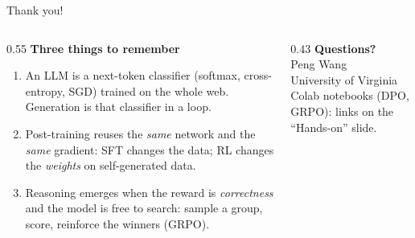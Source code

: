 \begin{frame}{Thank you!}
\begin{columns}[T]
\begin{column}{0.55\textwidth}
\textbf{Three things to remember}
\begin{enumerate}\setlength{\itemsep}{6pt}
  \item An LLM is a next-token classifier (softmax, cross-entropy, SGD) trained on the whole web. Generation is that classifier in a loop.
  \item Post-training reuses the \emph{same} network and the \emph{same} gradient: SFT changes the data; RL changes the \emph{weights} on self-generated data.
  \item Reasoning emerges when the reward is \emph{correctness} and the model is free to search: sample a group, score, reinforce the winners (GRPO).
\end{enumerate}
\end{column}
\begin{column}{0.43\textwidth}
\textbf{Questions?}\\[10pt]
Peng Wang \\ University of Virginia\\[10pt]
Colab notebooks (DPO, GRPO): links on the ``Hands-on'' slide.
\end{column}
\end{columns}
\end{frame}
